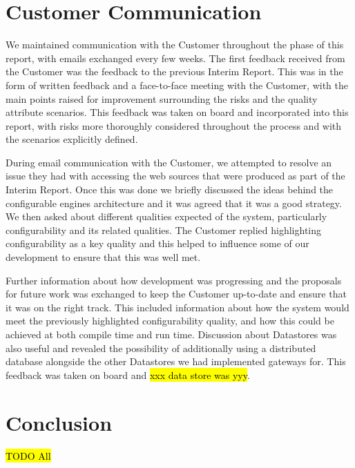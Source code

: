 \documentclass[10pt,a4paper]{article}
\begin{document}
\section{Customer Communication}
\label{sec:customer_comms}

We maintained communication with the Customer throughout the phase of this report, with emails exchanged every few weeks. The first feedback received from the Customer was the feedback to the previous Interim Report. This was in the form of written feedback and a face-to-face meeting with the Customer, with the main points raised for improvement surrounding the risks and the quality attribute scenarios. This feedback was taken on board and incorporated into this report, with risks more thoroughly considered throughout the process and with the scenarios explicitly defined.

During email communication with the Customer, we attempted to resolve an issue they had with accessing the web sources that were produced as part of the Interim Report. Once this was done we briefly discussed the ideas behind the configurable engines architecture and it was agreed that it was a good strategy. We then asked about different qualities expected of the system, particularly configurability and its related qualities. The Customer replied highlighting configurability as a key quality and this helped to influence some of our development to ensure that this was well met.

Further information about how development was progressing and the proposals for future work was exchanged to keep the Customer up-to-date and ensure that it was on the right track. This included information about how the system would meet the previously highlighted configurability quality, and how this could be achieved at both compile time and run time. Discussion about Datastores was also useful and revealed the possibility of additionally using a distributed database alongside the other Datastores we had implemented gateways for. This feedback was taken on board and \hl{xxx data store was yyy}.


\section{Conclusion}
\label{sec:conclusion}
\hl{TODO All}
\end{document}
